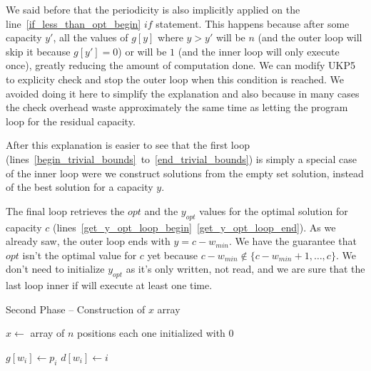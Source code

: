 \documentclass[12pt]{article}
\begin{document}
We said before that the periodicity is also implicitly applied on the line~\ref{if_less_than_opt_begin} \(if\) statement. This happens because after some capacity \(y'\), all the values of \(g[y]\) where \(y > y'\) will be \(n\) (and the outer loop will skip it because \(g[y'] = 0\)) or will be \(1\) (and the inner loop will only execute once), greatly reducing the amount of computation done. We can modify UKP5 to explicity check and stop the outer loop when this condition is reached. We avoided doing it here to simplify the explanation and also because in many cases the check overhead waste approximately the same time as letting the program loop for the residual capacity.

After this explanation is easier to see that the first loop (lines~\ref{begin_trivial_bounds}~to~\ref{end_trivial_bounds}) is simply a special case of the inner loop were we construct solutions from the empty set solution, instead of the best solution for a capacity \(y\).

The final loop retrieves the \(opt\) and the \(y_{opt}\) values for the optimal solution for capacity \(c\) (lines~\ref{get_y_opt_loop_begin}~\ref{get_y_opt_loop_end}). As we already saw, the outer loop ends with \(y = c-w_{min}\). We have the guarantee that \(opt\) isn't the optimal value for \(c\) yet because \(c-w_{min} \not\in \{c-w_{min}+1, \ldots, c\}\). We don't need to initialize \(y_{opt}\) as it's only written, not read, and we are sure that the last loop inner if will execute at least one time.

\begin{algorithm}
\caption{Second Phase -- Construction of \(x\) array}\label{alg:ukp6_second_phase}
\begin{algorithmic}[1]
  \State \(x \gets\) array of \(n\) positions each one initialized with \(0\)\label{create_x}
  
  \label{begin_trivial_bounds}
      \State \(g[w_i] \gets p_i\)
      \State \(d[w_i] \gets i\)
    \EndIf
  \EndFor\label{end_trivial_bounds}
\EndProcedure
\end{algorithmic}
\end{algorithm}
\end{document}
